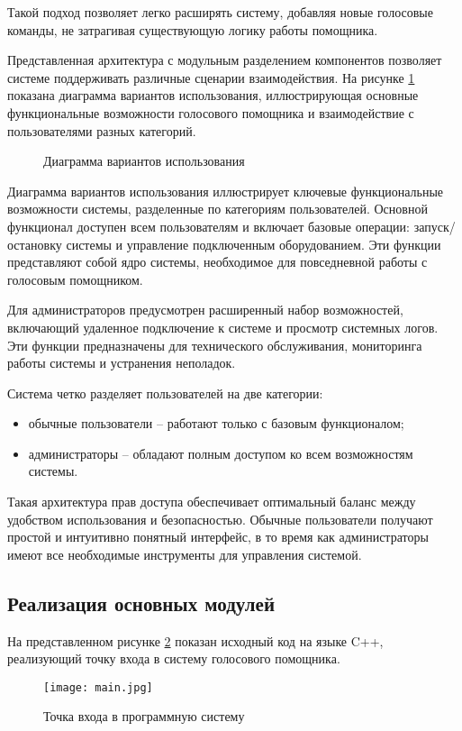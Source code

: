 Такой подход позволяет легко расширять систему, добавляя новые голосовые команды, не затрагивая существующую логику работы помощника.

Представленная архитектура с модульным разделением компонентов позволяет системе поддерживать различные сценарии взаимодействия. На рисунке \ref{fig:use_case_diagram} показана диаграмма вариантов использования, иллюстрирующая основные функциональные возможности голосового помощника и взаимодействие с пользователями разных категорий.

\begin{figure}[H]
	\centering
	\caption{Диаграмма вариантов использования}
	\label{fig:use_case_diagram}
\end{figure}

Диаграмма вариантов использования иллюстрирует ключевые функциональные возможности системы, разделенные по категориям пользователей. Основной функционал доступен всем пользователям и включает базовые операции: запуск/остановку системы и управление подключенным оборудованием. Эти функции представляют собой ядро системы, необходимое для повседневной работы с голосовым помощником.

Для администраторов предусмотрен расширенный набор возможностей, включающий удаленное подключение к системе и просмотр системных логов. Эти функции предназначены для технического обслуживания, мониторинга работы системы и устранения неполадок.

Система четко разделяет пользователей на две категории:
\begin{itemize}
	\item обычные пользователи -- работают только с базовым функционалом;
	\item администраторы -- обладают полным доступом ко всем возможностям системы.
\end{itemize}

Такая архитектура прав доступа обеспечивает оптимальный баланс между удобством использования и безопасностью. Обычные пользователи получают простой и интуитивно понятный интерфейс, в то время как администраторы имеют все необходимые инструменты для управления системой.

\subsection{Реализация основных модулей}

На представленном рисунке \ref{fig:main.cpp} показан исходный код на языке C++, реализующий точку входа в систему голосового помощника.
\begin{figure}[H]
	\centering
	\texttt{[image: main.jpg]}
	\caption{Точка входа в программную систему}
	\label{fig:main.cpp}
\end{figure}

